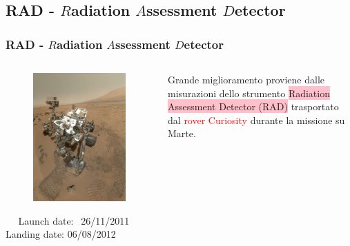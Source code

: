\documentclass[9pt]{beamer}
\begin{document}
\subsection{RAD - $R$adiation $A$ssessment $D$etector}
\begin{frame} [fragile]
	\frametitle{RAD - $R$adiation $A$ssessment $D$etector}
\begin{columns}
  \begin{column}{0.50\textwidth}
\begin{figure}
	  \centering
			\includegraphics[scale=0.10]{figures/fig6_1.jpg}
		\end{figure}
		\begin{block}{}
		\centering
		$\>$$\>$$\>$$\>$$\>$$\>$Launch date:$\>$$\>$ 26/11/2011\newline
		Landing date: 06/08/2012
		\end{block}
	 \end{column}
    \begin{column}{0.50\textwidth}
 Grande miglioramento proviene dalle misurazioni dello strumento \colorbox{pink}{Radiation Assessment Detector (RAD)}  trasportato dal \textcolor{red}{rover Curiosity} durante la missione su Marte. 
\newline


\end{column}
\end{columns}
\end{frame}
\end{document}
